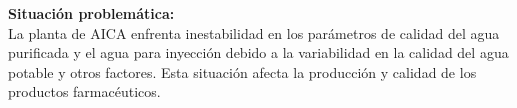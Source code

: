 \textbf{Situación problemática:}\\
La planta de AICA enfrenta inestabilidad en los parámetros de calidad del agua purificada y el agua para inyección debido a la variabilidad en la calidad del agua potable y otros factores. Esta situación afecta la producción y calidad de los productos farmacéuticos.

